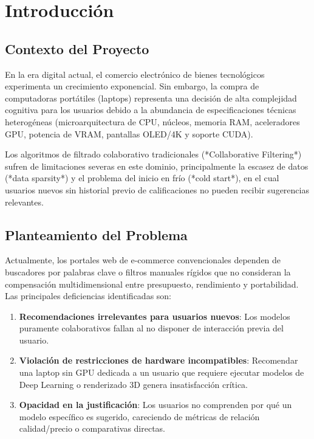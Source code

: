 \chapter{Introducción}

\section{Contexto del Proyecto}
En la era digital actual, el comercio electrónico de bienes tecnológicos experimenta un crecimiento exponencial. Sin embargo, la compra de computadoras portátiles (laptops) representa una decisión de alta complejidad cognitiva para los usuarios debido a la abundancia de especificaciones técnicas heterogéneas (microarquitectura de CPU, núcleos, memoria RAM, aceleradores GPU, potencia de VRAM, pantallas OLED/4K y soporte CUDA). 

Los algoritmos de filtrado colaborativo tradicionales (*Collaborative Filtering*) sufren de limitaciones severas en este dominio, principalmente la escasez de datos (*data sparsity*) y el problema del inicio en frío (*cold start*), en el cual usuarios nuevos sin historial previo de calificaciones no pueden recibir sugerencias relevantes.

\section{Planteamiento del Problema}
Actualmente, los portales web de e-commerce convencionales dependen de buscadores por palabras clave o filtros manuales rígidos que no consideran la compensación multidimensional entre presupuesto, rendimiento y portabilidad. Las principales deficiencias identificadas son:
\begin{enumerate}
    \item \textbf{Recomendaciones irrelevantes para usuarios nuevos}: Los modelos puramente colaborativos fallan al no disponer de interacción previa del usuario.
    \item \textbf{Violación de restricciones de hardware incompatibles}: Recomendar una laptop sin GPU dedicada a un usuario que requiere ejecutar modelos de Deep Learning o renderizado 3D genera insatisfacción crítica.
    \item \textbf{Opacidad en la justificación}: Los usuarios no comprenden por qué un modelo específico es sugerido, careciendo de métricas de relación calidad/precio o comparativas directas.
\end{enumerate}

